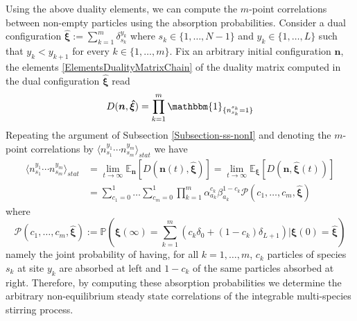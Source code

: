 \documentclass[10pt]{article}
\numberwithin{equation}{section}
\numberwithin{equation}{subsection}
\begin{document}
Using the above duality elements, we can compute the  $m$-point correlations between non-empty particles using the absorption probabilities. Consider a dual configuration $\bm{\hat{\xi}}:=\sum_{k=1}^{m}\delta_{s_{k}}^{y_{k}}$ where $s_{k}\in\{1,\ldots,N-1\}$ and $y_{k}\in\{1,\ldots,L\}$ such that $y_{k}<y_{k+1}$ for every $k\in\{1,\ldots,m\}$. Fix an arbitrary initial configuration $\bm{n}$, the elements \eqref{ElementsDualityMatrixChain} of the duality matrix computed in the dual configuration $\bm{\hat{\xi}}$ read
\begin{equation}
	D(\bm{n},\bm{\hat{\xi}})=\prod_{k=1}^{m}\mathbbm{1}_{\{n_{s_{k}}^{s_{k}}=1\}}
\end{equation}
Repeating the argument of Subsection \ref{Subsection-ss-nonI} and denoting the $m$-point correlations by $\langle n_{s_{1}}^{y_{1}}\cdots n_{s_{m}}^{y_{m}}\rangle_{stat}$ we have 
\begin{equation}\label{CorrelationByABS-prob}
	\begin{split}
	\langle n_{s_{1}}^{y_{1}}\cdots n_{s_{m}}^{y_{m}}\rangle_{stat}&=\lim_{t\to \infty}\mathbb{E}_{\bm{n}}\left[D(\bm{n}(t),\bm{\hat{\xi}})\right]=\lim_{t\to \infty}\mathbb{E}_{\bm{\xi}}\left[D(\bm{n},\bm{\hat{\xi}}(t))\right]
	\\&=\sum_{c_{1}=0}^{1}\ldots \sum_{c_{m}=0}^{1}\prod_{k=1}^{m}\alpha_{a_{k}}^{c_{k}}\beta_{a_{k}}^{1-c_{k}}\mathcal{P}(c_{1},\ldots,c_{m},\hat{\bm{\xi}})
\end{split}
\end{equation}
where
\begin{equation}\label{absProbabilitiesIntegrable}
	\mathcal{P}(c_{1},\ldots,c_{m},\hat{\bm{\xi}}):=\mathbb{P}\left(\bm{\xi}(\infty)=\sum_{k=1}^{m}\left(c_{k}\delta_{0}+(1-c_{k})\delta_{L+1}\right)\lvert \bm{\xi}(0)=\hat{\bm{\xi}}\right)
\end{equation}
 namely the joint probability of having, for all $k=1,\ldots,m$, $c_{k}$ particles of species $s_{k}$ at site $y_{k}$ are absorbed at left and $1-c_{k}$ of the same particles absorbed at right. Therefore, by computing these absorption probabilities we determine the arbitrary non-equilibrium steady state correlations of the integrable multi-species stirring process. 
\end{document}
